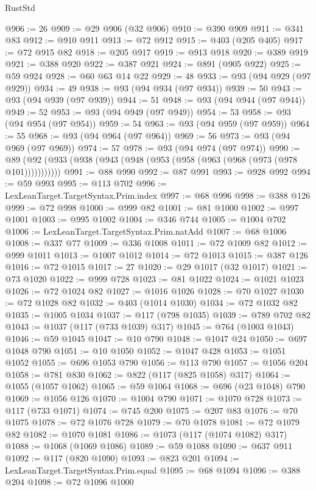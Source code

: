 \begin{lexlean}{RustStd}
\begin{coremodule}
{\begin{coremodule}
{{{{{{{{{{{{{{{{{{{{{{{{{{{{{{{{{{{{{{{{{{{{{{{{{{{{{{{@906 := 26
@909 := @29 @906 (@32 @906)
@910 := @390 @909
@911 := @341 @83
@912 := @910 @911
@913 := @72 @912
@915 := @403 (@205 @405)
@917 := @72 @915 @82
@918 := @205 @917
@919 := @913 @918
@920 := @389 @919
@921 := @388 @920
@922 := @387 @921
@924 := @891 (@905 @922)
@925 := @59 @924
@928 := @60 @63 @14 @22
@929 := 48
@933 := @93 (@94 @929 (@97 @929))
@934 := 49
@938 := @93 (@94 @934 (@97 @934))
@939 := 50
@943 := @93 (@94 @939 (@97 @939))
@944 := 51
@948 := @93 (@94 @944 (@97 @944))
@949 := 52
@953 := @93 (@94 @949 (@97 @949))
@954 := 53
@958 := @93 (@94 @954 (@97 @954))
@959 := 54
@963 := @93 (@94 @959 (@97 @959))
@964 := 55
@968 := @93 (@94 @964 (@97 @964))
@969 := 56
@973 := @93 (@94 @969 (@97 @969))
@974 := 57
@978 := @93 (@94 @974 (@97 @974))
@990 := @89 (@92 (@933 (@938 (@943 (@948 (@953 (@958 (@963 (@968 (@973 (@978 @101)))))))))))
@991 := @88 @990
@992 := @87 @991
@993 := @928 @992
@994 := @59 @993
@995 := @113 @702
@996 := LexLeanTarget.TargetSyntax.Prim.index
@997 := @68 @996
@998 := @388 @126
@999 := @72 @998
@1000 := @999 @82
@1001 := @81 @1000
@1002 := @997 @1001
@1003 := @995 @1002
@1004 := @346 @744
@1005 := @1004 @702
@1006 := LexLeanTarget.TargetSyntax.Prim.natAdd
@1007 := @68 @1006
@1008 := @337 @77
@1009 := @336 @1008
@1011 := @72 @1009 @82
@1012 := @999 @1011
@1013 := @1007 @1012
@1014 := @72 @1013
@1015 := @387 @126
@1016 := @72 @1015
@1017 := 27
@1020 := @29 @1017 (@32 @1017)
@1021 := @73 @1020
@1022 := @999 @728
@1023 := @81 @1022
@1024 := @1021 @1023
@1026 := @72 @1024 @82
@1027 := @1016 @1026
@1028 := @70 @1027
@1030 := @72 @1028 @82
@1032 := @403 (@1014 @1030)
@1034 := @72 @1032 @82
@1035 := @1005 @1034
@1037 := @117 (@798 @1035)
@1039 := @789 @702 @82
@1043 := @1037 (@117 (@733 @1039) @317)
@1045 := @764 (@1003 @1043)
@1046 := @59 @1045
@1047 := @10 @790
@1048 := @1047 @24
@1050 := @697 @1048 @790
@1051 := @10 @1050
@1052 := @1047 @428
@1053 := @1051 @1052
@1055 := @696 @1053 @790
@1056 := @113 @790
@1057 := @1056 @204
@1058 := @781 @830
@1062 := @822 (@117 (@825 @1058) @317)
@1064 := @1055 (@1057 @1062)
@1065 := @59 @1064
@1068 := @696 (@23 @1048) @790
@1069 := @1056 @126
@1070 := @1004 @790
@1071 := @1070 @728
@1073 := @117 (@733 @1071)
@1074 := @745 @200
@1075 := @207 @83
@1076 := @70 @1075
@1078 := @72 @1076 @728
@1079 := @70 @1078
@1081 := @72 @1079 @82
@1082 := @1070 @1081
@1086 := @1073 (@117 (@1074 @1082) @317)
@1088 := @1068 (@1069 @1086)
@1089 := @59 @1088
@1090 := @637 @911
@1092 := @117 (@820 @1090)
@1093 := @823 @201
@1094 := LexLeanTarget.TargetSyntax.Prim.equal
@1095 := @68 @1094
@1096 := @388 @204
@1098 := @72 @1096 @1000
}}}}}}}}}}}}}}}}}}}}}}}}}}}}}}}}}}}}}}}}}}}}}}}}}}}}}}}
\end{coremodule}}
\end{coremodule}
\end{lexlean}
